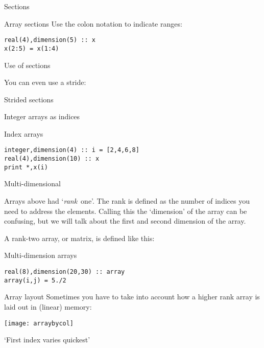  {Sections}

\begin{block}{Array sections}
  \label{sl:farray-section}
  Use the colon notation to indicate ranges:
\begin{verbatim}
real(4),dimension(5) :: x
x(2:5) = x(1:4)
\end{verbatim}
\end{block}

\begin{block}{Use of sections}
  \label{sl:farray-sectionassign}
\end{block}

You can even use a stride:

\begin{block}{Strided sections}
  \label{sl:farray-strideassign}
\end{block}

 {Integer arrays as indices}

\begin{block}{Index arrays}
  \label{sl:farray-indexarray}
\begin{verbatim}
integer,dimension(4) :: i = [2,4,6,8]
real(4),dimension(10) :: x
print *,x(i)
\end{verbatim}
\end{block}

 {Multi-dimensional}

Arrays above had `\emph{rank}~one'. The rank is
defined as the number of indices you need to address the
elements. Calling this the `dimension' of the array can be confusing, but
we will talk about the first and second dimension of the array.

A rank-two array, or matrix, is defined like this:
\begin{block}{Multi-dimension arrays}
  \label{sl:farray-2d}
\begin{verbatim}
real(8),dimension(20,30) :: array
array(i,j) = 5./2
\end{verbatim}
\end{block}

\begin{block}{Array layout}
  \label{sl:farray-layout}
  Sometimes you have to take into account how a higher rank array
  is laid out in (linear) memory:

  \texttt{[image: arraybycol]}

  `First index varies quickest'
\end{block}

